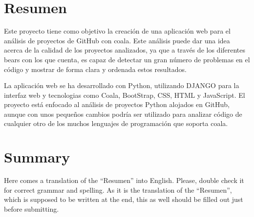 \documentclass[a4paper, 12pt]{book}
\begin{document}

\chapter*{Resumen}

Este proyecto tiene como objetivo la creación de una aplicación web para el análisis de
proyectos de GitHub con coala. Este análisis puede dar una idea acerca de la calidad de
los proyectos analizados, ya que a través de los diferentes bears con los que cuenta, es
capaz de detectar un gran número de problemas en el código y mostrar de forma clara y ordenada
estos resultados.

La aplicación web se ha desarrollado con Python, utilizando DJANGO para la interfaz web
y tecnologias como Coala, BootStrap, CSS, HTML y JavaScript. El proyecto está enfocado al
análisis de proyectos Python alojados en GitHub, aunque con unos pequeños cambios podría ser
utilizado para analizar código de cualquier otro de los muchos lenguajes de programación que
soporta coala.


\chapter*{Summary}

Here comes a translation of the ``Resumen'' into English. Please, double check
it for correct grammar and spelling. As it is the translation of the ``Resumen'',
which is supposed to be written at the end, this as well should be filled out
just before submitting.



\end{document}
